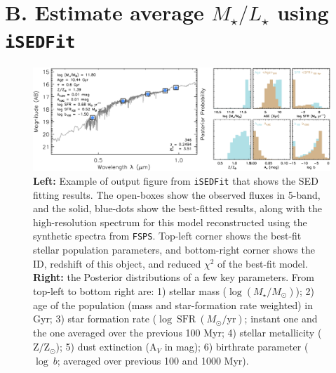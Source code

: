\documentclass[a4paper,fleqn,usenatbib]{mnras}
\def\logms{{$\log (M_{\star}/M_{\odot})$}}
\begin{document}

\section{B. Estimate average {$M_{\star}/L_{\star}$} using \texttt{iSEDFit}} 
    \label{app:sed} 

    \begin{figure}
        \begin{center}
        \includegraphics[width=\textwidth]{fig/redbcg_isedfit_example.pdf}
        \caption{
            \textbf{Left:} Example of output figure from \texttt{iSEDFit} that shows 
            the SED fitting results. 
            The open-boxes show the observed fluxes in 5-band, and the solid, blue-dots
            show the best-fitted results, along with the high-resolution spectrum for
            this model reconstructed using the synthetic spectra from \texttt{FSPS}. 
            Top-left corner shows the best-fit stellar population parameters, and 
            bottom-right corner shows the ID, redshift of this object, and reduced 
            $\chi^2$ of the best-fit model.~~~
            \textbf{Right:} the Posterior distributions of a few key parameters.
            From top-left to bottom right are: 
            1) stellar mass (\logms{}); 
            2) age of the population (mass and star-formation rate weighted) in Gyr; 
            3) star formation rate ($\log\ \mathrm{SFR}\ (M_{\odot}/\mathrm{yr})$; 
            instant one and the one averaged over the previous 100 Myr; 
            4) stellar metallicity ($\mathrm{Z}/\mathrm{Z}_{\odot}$); 
            5) dust extinction ($\mathrm{A}_V$ in mag);
            6) birthrate parameter ($\log\ b$; averaged over previous 100 and 1000 Myr).
            }
        \label{fig:ised}
        \end{center}
    \end{figure}
\end{document}
